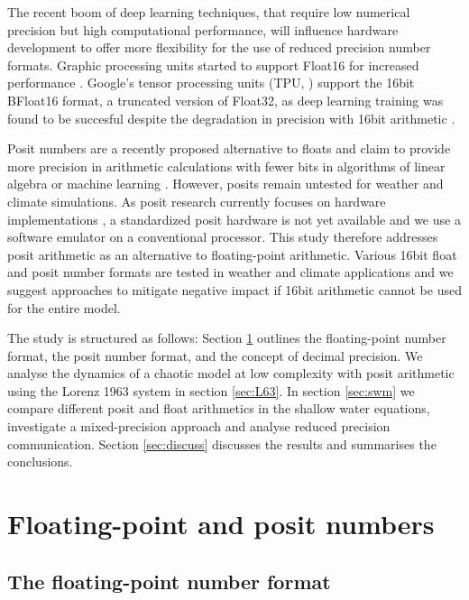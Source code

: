 \documentclass[draft]{agujournal2019}
\begin{document}
The recent boom of deep learning techniques, that require low numerical precision but high computational performance, will influence hardware development to offer more flexibility for the use of reduced precision number formats. Graphic processing units started to support Float16 for increased performance \cite{Markidis2018}. Google's tensor processing units (TPU, ) support the 16bit BFloat16 format, a truncated version of Float32, as deep learning training was found to be succesful despite the degradation in precision with 16bit arithmetic \cite{Kalamkar2019,Burgess2019,Gupta2015}.
 
Posit numbers are a recently proposed alternative to floats and claim to provide more precision in arithmetic calculations with fewer bits in algorithms of linear algebra or machine learning \cite{Gustafson2017,Langroudi2019}. However, posits remain untested for weather and climate simulations. As posit research currently focuses on hardware implementations \cite{vanDam2019,Chen2018,Chaurasiya2018,Glaser2017}, a standardized posit hardware is not yet available and we use a software emulator on a conventional processor. This study therefore addresses posit arithmetic as an alternative to floating-point arithmetic. Various 16bit float and posit number formats are tested in weather and climate applications and we suggest approaches to mitigate negative impact if 16bit arithmetic cannot be used for the entire model.

The study  is structured as follows: Section \ref{sec:posits} outlines the floating-point number format, the posit number format, and the concept of decimal precision. We analyse the dynamics of a chaotic model at low complexity with posit arithmetic using the Lorenz 1963 system in section \ref{sec:L63}. In section \ref{sec:swm} we compare different posit and float arithmetics in the shallow water equations, investigate a mixed-precision approach and analyse reduced precision communication. Section \ref{sec:discuss} discusses the results and summarises the conclusions.

\section{Floating-point and posit numbers}
\label{sec:posits}

\subsection{The floating-point number format}
\label{sec:floats}
\end{document}
